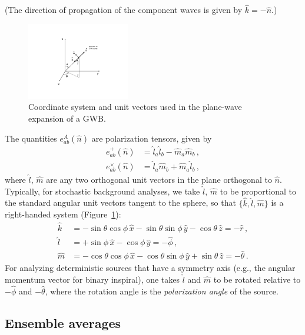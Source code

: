 \documentclass[11pt]{article}
\numberwithin{equation}{section}
\def\be{\begin{equation}}
\def\ee{\end{equation}}
\begin{document}
(The direction of propagation of the component
waves is given by $\hat k=-\hat n$.)
%
\begin{figure}[htbp!]
\begin{center}
\includegraphics[width=0.4\textwidth]{Figures/plane_wave}
\caption{Coordinate system and unit vectors used in the 
plane-wave expansion of a GWB.}
\label{f:plane_wave}
\end{center}
\end{figure}
%
The quantities $e^A_{ab}(\hat n)$ are polarization
tensors, given by
%
\be
\begin{aligned}
e_{ab}^+(\hat n)
&=\hat l_a\hat l_b-\hat m_a\hat m_b\,,
\\
e_{ab}^\times(\hat n)
&=\hat l_a\hat m_b+\hat m_a\hat l_b\,,
\end{aligned}
\ee
%
where $\hat l$, $\hat m$ are any two orthogonal unit 
vectors in the plane orthogonal to $\hat n$.
Typically, for stochastic background analyses, 
we take $\hat l$, $\hat m$ to be proportional to 
the standard angular unit vectors tangent to the sphere,
so that $\{\hat k, \hat l, \hat m\}$ is a right-handed
system (Figure~\ref{f:plane_wave}):
%
\be
\begin{aligned}
\hat k
&=-\sin\theta\cos\phi\,\hat x
-\sin\theta\sin\phi\,\hat y
-\cos\theta\,\hat z
= -\hat r\,,
\\
\hat l
&=+\sin\phi\,\hat x
-\cos\phi\,\hat y
= -\hat\phi\,,
\\
\hat m
&=-\cos\theta\cos\phi\,\hat x
-\cos\theta\sin\phi\,\hat y
+\sin\theta\,\hat z 
= -\hat\theta\,.
\end{aligned}
\label{e:klm_def}
\ee
%
For analyzing deterministic sources that have 
a symmetry axis (e.g., the angular momentum 
vector for binary inspiral), one takes 
$\hat l$ and $\hat m$ to be rotated relative 
to $-\hat\phi$ and $-\hat\theta$, 
where the rotation angle is the 
{\em polarization angle} of the source.

\subsection{Ensemble averages}
\label{s:ensemble_averages}
\end{document}
